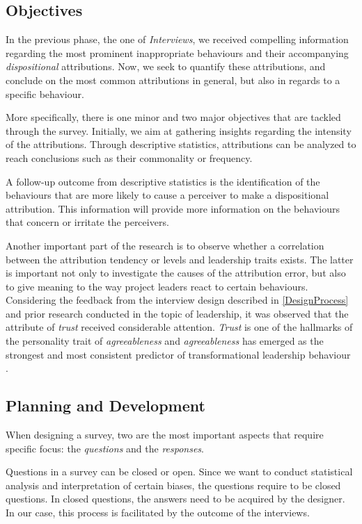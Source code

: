 \subsection{Objectives}

In the previous phase, the one of \textit{Interviews}, we received compelling information regarding the most prominent inappropriate behaviours and their accompanying \textit{dispositional} attributions.  Now, we seek to quantify these attributions, and conclude on the most common attributions in general, but also in regards to a specific behaviour.

More specifically, there is one minor and two major objectives that are tackled through the survey. Initially, we aim at gathering insights regarding the intensity of the attributions. Through descriptive statistics, attributions can be analyzed to reach conclusions such as their commonality or frequency.

A follow-up outcome from descriptive statistics is the identification of the behaviours that are more likely to cause a perceiver to make a dispositional attribution. This information will provide more information on the behaviours that concern or irritate the perceivers.

Another important part of the research is to observe whether a correlation between the attribution tendency or levels and leadership traits exists. The latter is important not only to investigate the causes of the attribution error, but also to give meaning to the way project leaders react to certain behaviours. Considering the feedback from the interview design described in \ref{DesignProcess} and prior research conducted in the topic of leadership, it was observed that the attribute of \textit{trust} received considerable attention. \textit{Trust} is one of the hallmarks of the personality trait of \textit{agreeableness} \cite{Kuhnert1987} and \textit{agreeableness} has emerged as the strongest and most consistent predictor of transformational leadership behaviour \cite{Judge2000}.

\subsection{Planning and Development}

When designing a survey, two are the most important aspects that require specific focus: the \textit{questions} and the \textit{responses}. 

Questions in a survey can be closed or open. Since we want to conduct statistical analysis and interpretation of certain biases, the questions require to be closed questions. In closed questions, the answers need to be acquired by the designer. In our case, this process is facilitated by the outcome of the interviews. 

